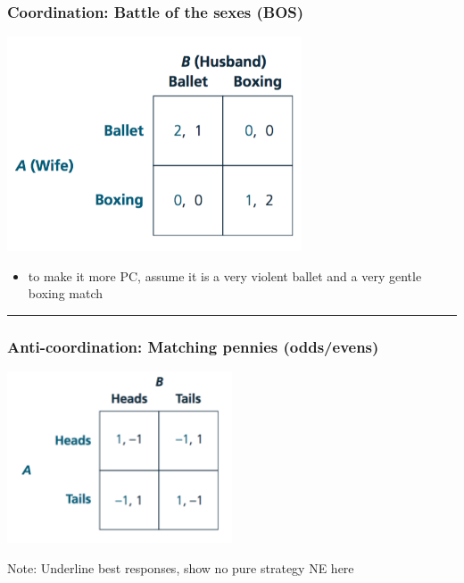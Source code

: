 \documentclass[]{article}
\providecommand{\tightlist}{%
  \setlength{\itemsep}{0pt}\setlength{\parskip}{0pt}}
\begin{document}
\hypertarget{coordination-battle-of-the-sexes-bos}{%
\subsubsection{Coordination: Battle of the sexes
(BOS)}\label{coordination-battle-of-the-sexes-bos}}

\includegraphics[height=2.5in]{picsfigs/bosmatrix.png}

\begin{itemize}
\tightlist
\item
  to make it more PC, assume it is a very violent ballet and a very
  gentle boxing match
\end{itemize}

\begin{center}\rule{0.5\linewidth}{\linethickness}\end{center}

\hypertarget{anti-coordination-matching-pennies-oddsevens}{%
\subsubsection{Anti-coordination: Matching pennies
(odds/evens)}\label{anti-coordination-matching-pennies-oddsevens}}

\includegraphics[height=2in]{picsfigs/matchpennies.png}

Note: Underline best responses, show no pure strategy NE here
\end{document}
